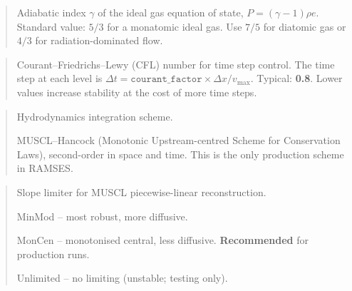 \begin{quote}
Adiabatic index $\gamma$ of the ideal gas equation of state,
$P = (\gamma - 1) \rho e$.
Standard value: $5/3$ for a monatomic ideal gas.  Use $7/5$ for
diatomic gas or $4/3$ for radiation-dominated flow.
\end{quote}

\label{param:courant_factor}

\begin{quote}
Courant--Friedrichs--Lewy (CFL) number for time step control.  The
time step at each level is
$\Delta t = \texttt{courant\_factor} \times \Delta x / v_{\max}$.
Typical: \textbf{0.8}.  Lower values increase stability at the cost
of more time steps.
\end{quote}

\label{param:scheme}

\begin{quote}
Hydrodynamics integration scheme.
\begin{description}[style=nextline,leftmargin=2.5cm,font=\ttfamily]
  \item[`muscl'] MUSCL--Hancock (Monotonic Upstream-centred Scheme
    for Conservation Laws), second-order in space and time.  This is
    the only production scheme in RAMSES.
\end{description}
\end{quote}

\label{param:slope_type}

\begin{quote}
Slope limiter for MUSCL piecewise-linear reconstruction.
\begin{description}[style=nextline,leftmargin=1.5cm,font=\ttfamily]
  \item[1] MinMod -- most robust, more diffusive.
  \item[2] MonCen -- monotonised central, less diffusive.
        \textbf{Recommended} for production runs.
  \item[3] Unlimited -- no limiting (unstable; testing only).
\end{description}
\end{quote}

\label{param:riemann}

